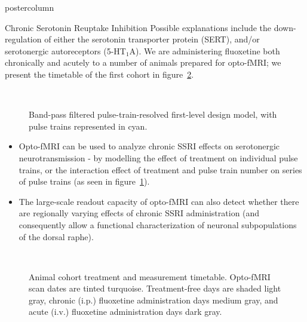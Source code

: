 \documentclass{beamer}
\begin{document}
\begin{frame}
\begin{columns}
\begin{column}{.43\textwidth}
\begin{beamercolorbox}[center]{postercolumn}
\begin{minipage}{.98\textwidth}
{\begin{myblock}{Chronic Serotonin Reuptake Inhibition}
						Possible explanations include the down-regulation of either the serotonin transporter protein (SERT), and/or serotonergic autoreceptors (5-HT$_1$A).
						We are administering fluoxetine both chronically and acutely to a number of animals prepared for opto-fMRI; we present the timetable of the first cohort in figure~\ref{fig:tt}.
						\vspace{0.5em}
						\begin{figure}
							\begin{minipage}{0.94\textwidth}
								\centering%
\\%
								\caption{Band-pass filtered pulse-train-resolved first-level design model, with pulse trains represented in cyan.}
								\label{fig:stim}
							\end{minipage}
						\end{figure}
						\begin{itemize}
							\item Opto-fMRI can be used to analyze chronic SSRI effects on serotonergic neurotransmission - by modelling the effect of treatment on individual pulse trains, or the interaction effect of treatment and pulse train number on series of pulse trains (as seen in figure~\ref{fig:stim}).
						 	\item The large-scale readout capacity of opto-fMRI can also detect whether there are regionally varying effects of chronic SSRI administration (and consequently allow a functional characterization of neuronal subpopulations of the dorsal raphe).
						\end{itemize}
						\vspace{0.5em}
						\begin{figure}
							\begin{minipage}{0.94\textwidth}
								\centering%
\\%
								\caption{Animal cohort treatment and measurement timetable. Opto-fMRI scan dates are tinted turquoise. Treatment-free days are shaded light gray, chronic (i.p.) fluoxetine administration days medium gray, and acute (i.v.) fluoxetine administration days dark gray.}
								\label{fig:tt}
							\end{minipage}
						\end{figure}
					\end{myblock}\vfill
		}\end{minipage}\end{beamercolorbox}

\end{column}
\end{columns}
\end{frame}
\end{document}
